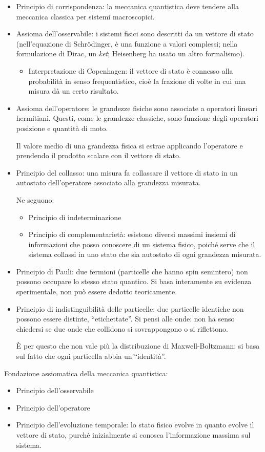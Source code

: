 \begin{itemize}
    \item Principio di corrispondenza: la meccanica quantistica deve tendere alla meccanica classica per sistemi macroscopici.
    \item Assioma dell'osservabile: i sistemi fisici sono descritti da un vettore di stato (nell'equazione di Schrödinger, è una funzione a valori complessi; nella formulazione di Dirac, un \textit{ket}; Heisenberg ha usato un altro formalismo).
    \begin{itemize}
        \item Interpretazione di Copenhagen: il vettore di stato è connesso alla probabilità in senso frequentistico, cioè la frazione di volte in cui una misura dà un certo risultato.
    \end{itemize}
    \item Assioma dell'operatore: le grandezze fisiche sono associate a operatori lineari hermitiani.
    Questi, come le grandezze classiche, sono funzione degli operatori posizione e quantità di moto.

    Il valore medio di una grandezza fisica si estrae applicando l'operatore e prendendo il prodotto scalare con il vettore di stato.
    \item Principio del collasso: una misura fa collassare il vettore di stato in un autostato dell'operatore associato alla grandezza misurata.

    Ne seguono:
    \begin{itemize}
        \item Principio di indeterminazione
        \item Principio di complementarietà: esistono diversi massimi insiemi di informazioni che posso conoscere di un sistema fisico, poiché serve che il sistema collassi in uno stato che sia autostato di ogni grandezza misurata.
    \end{itemize}
    \item Principio di Pauli: due fermioni (particelle che hanno spin semintero) non possono occupare lo stesso stato quantico.
    Si basa interamente su evidenza sperimentale, non può essere dedotto teoricamente.
    \item Principio di indistinguibilità delle particelle: due particelle identiche non possono essere distinte, ``etichettate''.
    Si pensi alle onde: non ha senso chiedersi se due onde che collidono si sovrappongono o si riflettono.

    È per questo che non vale più la distribuzione di Maxwell-Boltzmann: si basa sul fatto che ogni particella abbia un'``identità''.
\end{itemize}


Fondazione assiomatica della meccanica quantistica:
\begin{itemize}
    \item Principio dell'osservabile
    \item Principio dell'operatore
    \item Principio dell'evoluzione temporale: lo stato fisico evolve in quanto evolve il vettore di stato, purché inizialmente si conosca l'informazione massima sul sistema.
\end{itemize}
